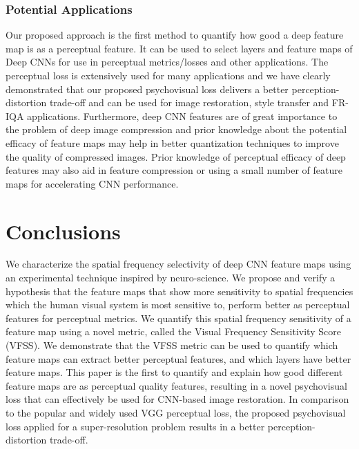 \documentclass[10pt,twocolumn,letterpaper]{article}
\begin{document}
\subsubsection{Potential Applications}
Our proposed approach is the first method to quantify how good a deep feature map is as a perceptual feature. It can be used to select layers and feature maps of Deep CNNs for use in perceptual metrics/losses and other applications. The perceptual loss is extensively used for many applications and we have clearly demonstrated that our proposed psychovisual loss delivers a better perception-distortion trade-off and can be used for image restoration, style transfer and FR-IQA applications. Furthermore, deep CNN features are of great importance to the problem of deep image compression and prior knowledge about the potential efficacy of feature maps may help in better quantization techniques to improve the quality of compressed images. Prior knowledge of perceptual efficacy of deep features may also aid in feature compression or using a small number of feature maps for accelerating CNN performance.

\section{Conclusions}
We characterize the spatial frequency selectivity of deep CNN feature maps using an experimental technique inspired by neuro-science. We propose and verify a hypothesis that the feature maps that show more sensitivity to spatial frequencies which the human visual system is most sensitive to, perform better as perceptual features for perceptual metrics. We quantify this spatial frequency sensitivity of a feature map using a novel metric, called the Visual Frequency Sensitivity Score (VFSS). We demonstrate that the VFSS metric can be used to quantify which feature maps can extract better perceptual features, and which layers have better feature maps. This paper is the first to quantify and explain how good different feature maps are as perceptual quality features, resulting in a novel psychovisual loss that can effectively be used for CNN-based image restoration. In comparison to the popular and widely used VGG perceptual loss, the proposed psychovisual loss applied for a super-resolution problem results in a better perception-distortion trade-off.
\end{document}
